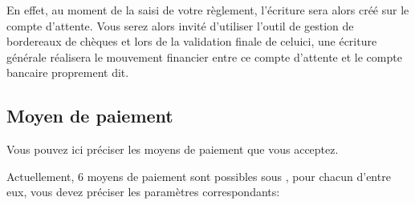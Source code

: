 \documentclass[a4paper,10pt,oneside,french]{sphinxmanual}
\begin{document}
\sphinxAtStartPar
En effet, au moment de la saisi de votre règlement, l’écriture sera alors créé sur le compte d’attente.
Vous serez alors invité d’utiliser l’outil de gestion de bordereaux de chèques et lors de la validation finale de celui\sphinxhyphen{}ci,
une écriture générale réalisera le mouvement financier entre ce compte d’attente et le compte bancaire proprement dit.


\subsection{Moyen de paiement}
\label{\detokenize{payoff/config:moyen-de-paiement}}
\sphinxAtStartPar
Vous pouvez ici préciser les moyens de paiement que vous acceptez.

\sphinxAtStartPar
Actuellement, 6 moyens de paiement sont possibles sous , pour chacun d’entre eux, vous devez préciser les paramètres correspondants:
\end{document}

